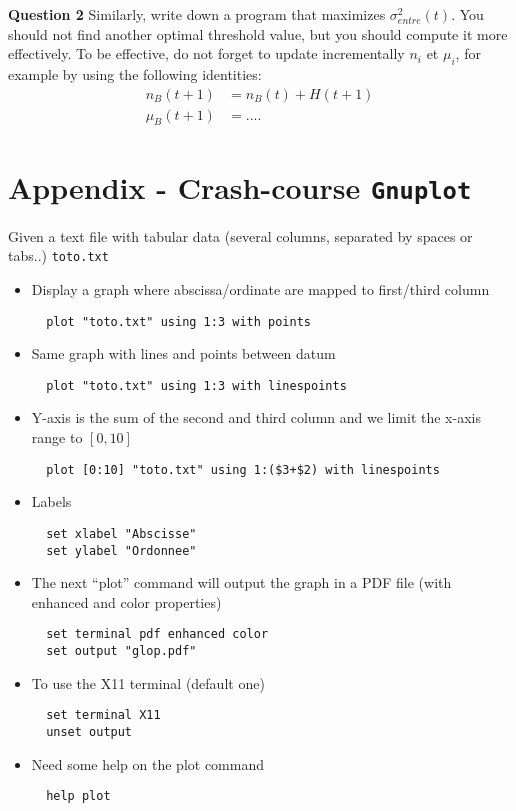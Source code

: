 \documentclass[a4paper, 11pt]{article}
\begin{document}
{\bf Question 2} Similarly, write down a program that maximizes $\sigma^2_{entre}(t)$. You should not find another optimal threshold value, but you should compute it more effectively. To be effective, do not forget to update incrementally  $n_i$ et $\mu_i$, for example by using the following identities:
\begin{align}
  n_B(t+1) & = n_B(t) + H(t+1)\\
  \mu_B(t+1)& = ....
\end{align}


\newpage
\section*{\bf Appendix - \rm Crash-course \texttt{Gnuplot}}

Given a text file with tabular data (several columns, separated by spaces or tabs..) \texttt{toto.txt}
\begin{itemize}
\item Display a graph where abscissa/ordinate  are mapped to first/third column  
\begin{verbatim}
  plot "toto.txt" using 1:3 with points
\end{verbatim}

\item Same graph with lines and points between datum
\begin{verbatim}
  plot "toto.txt" using 1:3 with linespoints
\end{verbatim}

\item Y-axis is the sum of the second and third column and we limit the x-axis range to $[0,10]$
\begin{verbatim}
  plot [0:10] "toto.txt" using 1:($3+$2) with linespoints
\end{verbatim}

\item Labels
\begin{verbatim}
  set xlabel "Abscisse"
  set ylabel "Ordonnee"
\end{verbatim}

\item The next ``plot'' command will output the graph in a PDF file (with enhanced and color properties)
\begin{verbatim}
  set terminal pdf enhanced color
  set output "glop.pdf"
\end{verbatim}

\item To use the X11 terminal (default one)
\begin{verbatim}
  set terminal X11
  unset output
\end{verbatim}

\item Need some help on the plot command
\begin{verbatim}
  help plot
\end{verbatim}

\end{itemize}
\end{document}
